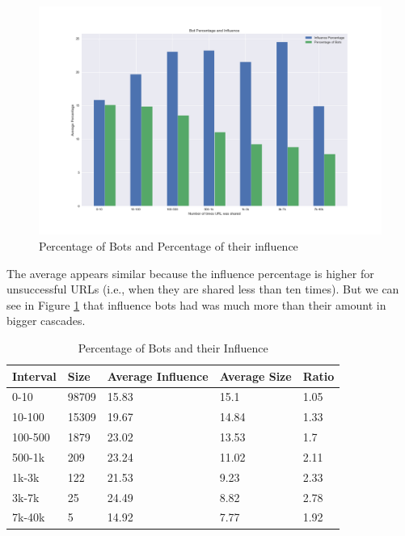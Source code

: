 \documentclass[letterpaper]{article}
\begin{document}
\begin{figure}[H]
    \includegraphics[width=\linewidth]{images/bots_influence_vs_size.png}
    \caption{Percentage of Bots and Percentage of their influence}
    \label{fig:bots_influence_vs_size}
\end{figure}

The average appears similar because the influence percentage is higher for unsuccessful URLs (i.e., when they are shared less than ten times). But we can see in Figure \ref{fig:bots_influence_vs_size}
that influence bots had was much more than their amount in bigger cascades.

\begin{table}[H]
    \centering
    \begin{tabular}{|l|l|l|l|l|}
    \hline
    \textbf{Interval} & \textbf{Size} & \textbf{Average Influence} & \textbf{Average Size} & \textbf{Ratio} \\ \hline
    0-10 & 98709 & 15.83 & 15.1 & 1.05 \\ \hline
    10-100 & 15309 & 19.67 & 14.84 & 1.33 \\ \hline
    100-500 & 1879 & 23.02 & 13.53 & 1.7 \\ \hline
    500-1k & 209 & 23.24 & 11.02 & 2.11 \\ \hline
    1k-3k & 122 & 21.53 & 9.23 & 2.33 \\ \hline
    3k-7k & 25 & 24.49 & 8.82 & 2.78 \\ \hline
    7k-40k & 5 & 14.92 & 7.77 & 1.92 \\ \hline
    \end{tabular}
    \caption{Percentage of Bots and their Influence}
    \label{tab:percentage_influence}
\end{table}
\end{document}

